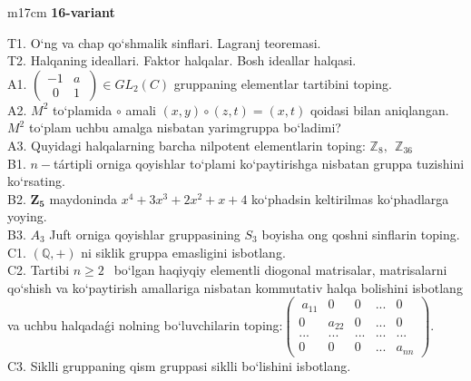 \documentclass{article}
\begin{document}
\begin{tabular}{m{17cm}}
\textbf{16-variant}
\newline

T1. O`ng va chap qo`shmalik sinflari. Lagranj teoremasi. \\
T2. Halqaning ideallari. Faktor halqalar. Bosh ideallar halqasi. \\
A1. \(\left( \begin{matrix}
 - 1 & a \\
\ \ 0 & 1
\end{matrix}\  \right) \in GL_{2}(C)\) gruppaning elementlar tartibini toping. \\
A2. \(M^{2}\) to`plamida \(\circ\) amali \((x,y) \circ (z,t) = (x,t)\) qoidasi bilan aniqlangan. \(M^{2}\) to`plam uchbu amalga nisbatan yarimgruppa bo`ladimi? \\
A3. Quyidagi halqalarning barcha nilpotent elementlarin toping: \(\mathbb{Z}_{8},\ \ \mathbb{Z}_{36}\) \\
B1. \(n -\)tártipli orniga qoyishlar to`plami ko`paytirishga nisbatan gruppa tuzishini ko`rsating. \\
B2. \(\mathbf{Z}_{\mathbf{5}}\) maydoninda \(x^{4} + 3x^{3} + 2x^{2} + x + 4\) ko`phadsin keltirilmas ko`phadlarga yoying. \\
B3. \(A_{3}\) Juft orniga qoyishlar gruppasining \(S_{3}\) boyisha o\textquotesingle ng qo\textquotesingle shni sinflarin toping. \\
C1. \((\mathbb{Q}, + )\) ni siklik gruppa emasligini isbotlang. \\
C2. Tartibi \(n \geq 2\ \ \) bo`lgan haqiyqiy elementli diogonal matrisalar, matrisalarni qo`shish va ko`paytirish amallariga nisbatan kommutativ halqa bolishini isbotlang va uchbu halqadaǵi nolning bo`luvchilarin toping:\(\begin{pmatrix}
\ a_{11} & 0\ \  & 0 & ... & 0\ \  \\
0\ \  & a_{22} & 0 & ... & 0\ \  \\
... & ... & ... & ... & ... \\
0\ \  & 0\ \  & 0 & ... & a_{nn}
\end{pmatrix}.\) \\
C3. Siklli gruppaning qism gruppasi siklli bo`lishini isbotlang. \\

\end{tabular}
\vspace{1cm}
\end{document}
